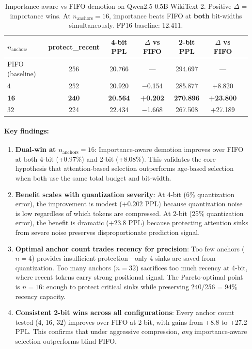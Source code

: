 \documentclass[11pt,a4paper]{article}
\begin{document}
\begin{table}[h]
\centering
\begin{tabular}{lcccccc}
\toprule
\textbf{$n_{\text{anchors}}$} & \textbf{protect\_recent} & \textbf{4-bit PPL} & \textbf{$\Delta$ vs FIFO} & \textbf{2-bit PPL} & \textbf{$\Delta$ vs FIFO} \\
\midrule
FIFO (baseline) & 256 & 20.766 & --- & 294.697 & --- \\
4 & 252 & 20.920 & $-$0.154 & 285.877 & +8.820 \\
\textbf{16} & \textbf{240} & \textbf{20.564} & \textbf{+0.202} & \textbf{270.896} & \textbf{+23.800} \\
32 & 224 & 22.434 & $-$1.668 & 267.508 & +27.189 \\
\bottomrule
\end{tabular}
\caption{Importance-aware vs FIFO demotion on Qwen2.5-0.5B WikiText-2. Positive $\Delta$ = importance wins. At $n_{\text{anchors}}=16$, importance beats FIFO at \textbf{both} bit-widths simultaneously. FP16 baseline: 12.411.}
\label{tab:importance_vs_fifo}
\end{table}

\paragraph{Key findings:}
\begin{enumerate}
    \item \textbf{Dual-win at $n_{\text{anchors}}=16$}: Importance-aware demotion improves over FIFO at both 4-bit (+0.97\%) and 2-bit (+8.08\%). This validates the core hypothesis that attention-based selection outperforms age-based selection when both use the same total budget and bit-width.

    \item \textbf{Benefit scales with quantization severity}: At 4-bit (6\% quantization error), the improvement is modest (+0.202 PPL) because quantization noise is low regardless of which tokens are compressed. At 2-bit (25\% quantization error), the benefit is dramatic (+23.8 PPL) because protecting attention sinks from severe noise preserves disproportionate prediction signal.

    \item \textbf{Optimal anchor count trades recency for precision}: Too few anchors ($n=4$) provides insufficient protection---only 4 sinks are saved from quantization. Too many anchors ($n=32$) sacrifices too much recency at 4-bit, where recent tokens carry strong positional signal. The Pareto-optimal point is $n=16$: enough to protect critical sinks while preserving 240/256 = 94\% recency capacity.

    \item \textbf{Consistent 2-bit wins across all configurations}: Every anchor count tested (4, 16, 32) improves over FIFO at 2-bit, with gains from +8.8 to +27.2 PPL. This confirms that under aggressive compression, \textit{any} importance-aware selection outperforms blind FIFO.
\end{enumerate}
\end{document}
